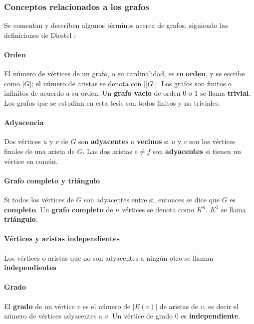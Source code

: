 \subsubsection{Conceptos relacionados a los grafos}

Se comentan y describen algunos términos acerca de grafos, siguiendo las definiciones de Diestel \cite{Diestel2005GraphTheory}:

\paragraph{Orden}
El número de vértices de un grafo, o su cardinalidad, es su \textbf{orden}, y se escribe como $|G|$; el número de aristas se denota con $||G||$. Los grafos son finitos o infinitos de acuerdo a su orden. Un \textbf{grafo vacio} de orden 0 o 1 se llama \textbf{trivial}. Los grafos que se estudian en esta tesis son todos finitos y no triviales.

\paragraph{Adyacencia}
Dos vértices $u$ y $v$ de $G$ son \textbf{adyacentes} o \textbf{vecinos} si $u$ y $v$ son los vértices finales de una arista de $G$. Las dos aristas $e\neq f$ son \textbf{adyacentes} si tienen un vértice en común. 

\paragraph{Grafo completo y triángulo}
Si todos los vértices de $G$ son adyacentes entre si, entonces se dice que $G$ es \textbf{completo}. Un \textbf{grafo completo} de $n$ vértices se denota como $K^{n}$. $K^{3}$ se llama \textbf{triángulo}.

\paragraph{Vértices y aristas independientes}
Los vértices o aristas que no son adyacentes a ningún otro se llaman \textbf{independientes}

\paragraph{Grado}
El \textbf{grado} de un vértice $v$ es el número de $|E(v)|$ de aristas de $v$, es decir el número de vértices adyacentes a $v$. Un vértice de grado 0 es \textbf{independiente}.

